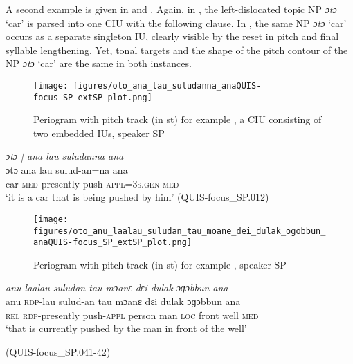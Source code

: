 A second example is given in  and . Again, in  , the left-dislocated topic NP \textit{ɔtɔ} ‘car’ is parsed into one CIU with the following clause. In  , the same NP \textit{ɔtɔ} ‘car’ occurs as a separate singleton IU, clearly visible by the reset in pitch and final syllable lengthening. Yet, tonal targets and the shape of the pitch contour of the NP \textit{ɔtɔ} ‘car’ are the same in both instances.



\begin{figure}
	\texttt{[image: figures/oto\_ana\_lau\_suludanna\_anaQUIS-focus\_SP\_extSP\_plot.png]}
	\caption{Periogram with pitch track (in st) for example , a CIU consisting of two embedded IUs, speaker SP}
	\label{pitch:oto ana lau suludanna ana}
\end{figure}


\ea
\label{ex:oto ana lau suludanna ana}
\textit{ɔtɔ | ana lau suludanna ana} \\
\gll ɔtɔ ana lau sulud-an=na ana	 \\
car \textsc{med} presently push\textsc{-appl}=3\textsc{s}.\textsc{gen} \textsc{med}\\
\glt ‘it is a car that is being pushed by him’ \hfill (QUIS-focus\_SP.012)
\z





\begin{figure}
	\texttt{[image: figures/oto\_anu\_laalau\_suludan\_tau\_moane\_dei\_dulak\_ogobbun\_anaQUIS-focus\_SP\_extSP\_plot.png]}
	\caption{Periogram with pitch track (in st) for example , speaker SP}
	\label{pitch:oto anu laalau}
\end{figure}




\ea
\label{ex:oto anu laalau}

{
	\ex
	\label{ex:anu laalau suludan tau moane dɛi dulak ɔɡɔbbun ana}
	\textit{anu laalau suludan tau mɔanɛ dɛi dulak ɔɡɔbbun ana} \\
	\gll anu \textsc{rdp}-lau sulud-an tau mɔanɛ dɛi dulak ɔɡɔbbun ana\\
	\textsc{rel} \textsc{rdp}-presently push-\textsc{appl} person man \textsc{loc} front well \textsc{med}\\
	\glt `that is currently pushed by the man in front of the well'
	\begin{flushright}(QUIS-focus\_SP.041-42)
		\end{flushright}
}
\z
\z



